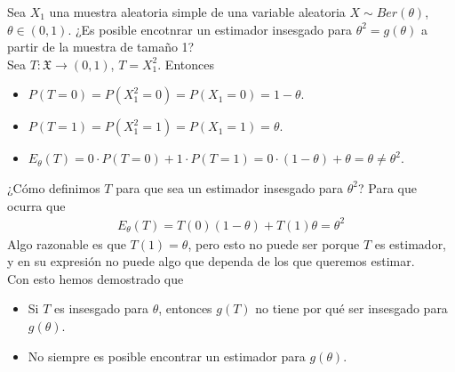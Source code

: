 \begin{ejemplo}
Sea $X_1$ una muestra aleatoria simple de una variable aleatoria $X \sim Ber(\theta)$, $\theta \in (0,1)$. ¿Es posible encotnrar un estimador insesgado para $\theta^2 = g(\theta)$ a partir de la muestra de tamaño 1?
\\
\newline
Sea $T : \mathfrak{X} \longrightarrow (0,1)$, $T = X_1^2$. Entonces
\begin{itemize}
    \item $P(T = 0) = P(X_1^2 = 0) = P(X_1 = 0) = 1 - \theta$.
    \item $P(T = 1) = P(X_1^2 = 1) = P(X_1 = 1) = \theta$.
    \item $E_{\theta}(T) = 0 \cdot P(T = 0) + 1 \cdot P(T = 1) = 0 \cdot (1 - \theta) + \theta = \theta \not = \theta^2$.
\end{itemize}
¿Cómo definimos $T$ para que sea un estimador insesgado para  $\theta^2$? Para que ocurra que
\begin{align*}
    E_{\theta}(T) = T(0) (1 - \theta)+ T(1) \theta = \theta^2
\end{align*}
Algo razonable es que $T(1) = \theta$, pero esto no puede ser porque $T$ es estimador, y en su expresión no puede algo que dependa de los que queremos estimar.
\\
\newline
Con esto hemos demostrado que
\begin{itemize}
    \item Si $T$ es insesgado para $\theta$, entonces $g(T)$ no tiene por qué ser insesgado para $g(\theta)$.
    \item No siempre es posible encontrar un estimador para $g(\theta)$.
\end{itemize}
\end{ejemplo}

